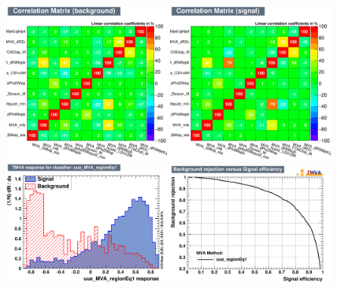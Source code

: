 \begin{figure}[htbp]
	\includegraphics[width=0.48\textwidth]{6_Search/Figures/MVAtechnics/toppairzut/uue/CorrelationMatrixB.png}
	\includegraphics[width=0.48\textwidth]{6_Search/Figures/MVAtechnics/toppairzut/uue/CorrelationMatrixS.png}
	\includegraphics[width=0.48\textwidth]{6_Search/Figures/MVAtechnics/toppairzut/uue/mva_uue_MVA_regionEq1.png}
	\includegraphics[width=0.48\textwidth]{6_Search/Figures/MVAtechnics/toppairzut/uue/rejBvsS.png}

\end{figure}
